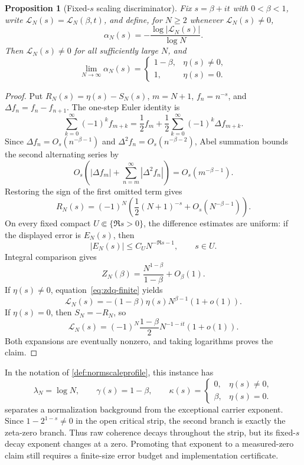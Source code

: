 \documentclass[11pt,a4paper]{article}
\theoremstyle{definition}
\theoremstyle{plain}
\newtheorem{proposition}[definition]{Proposition}
\theoremstyle{remark}
\begin{document}
\begin{proposition}[Fixed-\(s\) scaling discriminator]
\label{prop:eta-scaling}
Fix \(s=\beta+it\) with \(0<\beta<1\), write
\(\mathcal L_N(s)=\mathcal L_N(\beta,t)\), and define, for \(N\geq2\)
whenever
\(\mathcal L_N(s)\ne0\),
\[
 \alpha_N(s)=-\frac{\log|\mathcal L_N(s)|}{\log N}.
\]
Then \(\mathcal L_N(s)\ne0\) for all sufficiently large \(N\), and
\[
 \lim_{N\to\infty}\alpha_N(s)
 =
 \begin{cases}
  1-\beta,&\eta(s)\ne0,\\
  1,&\eta(s)=0.
 \end{cases}
\]
\end{proposition}
\begin{proof}
Put \(R_N(s)=\eta(s)-S_N(s)\), \(m=N+1\), \(f_n=n^{-s}\), and
\(\Delta f_n=f_n-f_{n+1}\).  The one-step Euler identity is
\[
 \sum_{k=0}^{\infty}(-1)^k f_{m+k}
 =\frac12f_m+
  \frac12\sum_{k=0}^{\infty}(-1)^k\Delta f_{m+k}.
\]
Since \(\Delta f_n=O_s(n^{-\beta-1})\) and
\(\Delta^2 f_n=O_s(n^{-\beta-2})\), Abel summation bounds the second
alternating series by
\[
 O_s\!\left(
  |\Delta f_m|+\sum_{n=m}^{\infty}|\Delta^2f_n|
 \right)
 =O_s(m^{-\beta-1}).
\]
Restoring the sign of the first omitted term gives
\[
 R_N(s)=(-1)^N\left(
  \frac12(N+1)^{-s}+O_s(N^{-\beta-1})
 \right).
\]
On every fixed compact \(U\Subset\{\Re s>0\}\), the difference estimates are
uniform: if the displayed error is \(E_N(s)\), then
\[
 |E_N(s)|\le C_U N^{-\Re s-1},\qquad s\in U.
\]
Integral comparison gives
\[
 Z_N(\beta)=\frac{N^{1-\beta}}{1-\beta}+O_\beta(1).
\]
If \(\eta(s)\ne0\), equation~\eqref{eq:zdq-finite} yields
\[
 \mathcal L_N(s)=-(1-\beta)\eta(s)N^{\beta-1}(1+o(1)).
\]
If \(\eta(s)=0\), then \(S_N=-R_N\), so
\[
 \mathcal L_N(s)
 =(-1)^N\frac{1-\beta}{2}N^{-1-it}(1+o(1)).
\]
Both expansions are eventually nonzero, and taking logarithms proves the
claim.
\end{proof}
In the notation of \cref{def:normscaleprofile}, this instance has
\[
 \lambda_N=\log N,\qquad
 \gamma(s)=1-\beta,\qquad
 \kappa(s)=
 \begin{cases}
 0,&\eta(s)\ne0,\\
 \beta,&\eta(s)=0.
 \end{cases}
\]
 separates a normalization background from the exceptional
carrier exponent.
Since \(1-2^{1-s}\ne0\) in the open critical strip, the second branch is
exactly the zeta-zero branch.  Thus raw coherence decays throughout the strip,
but its fixed-\(s\) decay exponent changes at a zero.  Promoting that exponent
to a measured-zero claim still requires a finite-size error budget and
implementation certificate.
\end{document}
